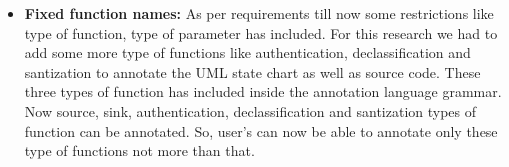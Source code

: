 \begin{itemize}
	\item \textbf{Fixed function names:} As per requirements till now some restrictions like type of function, type of parameter has included. For this research we had to add some more type of functions like authentication, declassification and santization to annotate the UML state chart as well as source code. These three types of function has included inside the annotation language grammar. Now source, sink, authentication, declassification and santization types of function can be annotated. So, user's can now be able to annotate only these type of functions not more than that.
	
\end{itemize}